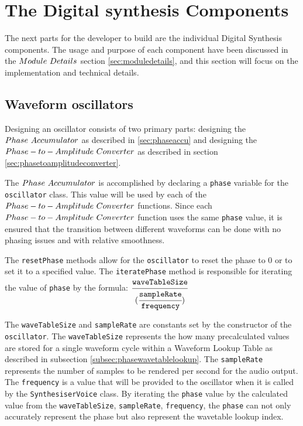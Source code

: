 \documentclass[a4paper,12pt]{report}
\begin{document}
\section{The Digital synthesis Components}
\label{sec:digitalsynthesiscomponents}
The next parts for the developer to build are the individual Digital Synthesis components. The usage and purpose of each component have been discussed in the $Module\ \-Details$ section \ref{sec:moduledetails}, and this section will focus on the implementation and technical details.

\subsection{Waveform oscillators}
\label{subsec:waveformosc}
Designing an oscillator consists of two primary parts: designing the $Phase\ \-Accumulator$ as described in \ref{sec:phaseaccu} and designing the $Phase-to-Amplitude\ \-Converter$ as described in section \ref{sec:phasetoamplitudeconverter}.

The $Phase\ \-Accumulator$ is accomplished by declaring a \texttt{phase} variable for the \texttt{oscillator} class. This value will be used by each of the $Phase-to-Amplitude\ \-Converter$ functions. Since each $Phase-to-Amplitude\ \-Converter$ function uses the same \texttt{phase} value, it is ensured that the transition between different waveforms can be done with no phasing issues and with relative smoothness.

The \texttt{resetPhase} methods allow for the \texttt{oscillator} to reset the phase to $0$ or to set it to a specified value. The \texttt{iteratePhase} method is responsible for iterating the value of \texttt{phase} by the formula: \begin{math}
\cfrac{\texttt{waveTableSize}}{(\cfrac{\texttt{sampleRate}}{\texttt{frequency}})}
\end{math}

The \texttt{wave\-Table\-Size} and \texttt{sample\-Rate} are constants set by the constructor of the \texttt{oscillator}. The \texttt{wave\-Table\-Size} represents the how many precalculated values are stored for a single waveform cycle within a Waveform Lookup Table as described in subsection \ref{subsec:phasewavetablelookup}. The \texttt{sample\-Rate} represents the number of samples to be rendered per second for the audio output. The \texttt{frequency} is a value that will be provided to the oscillator when it is called by the \texttt{Synthesiser\-Voice} class. By iterating the \texttt{phase} value by the calculated value from the \texttt{wave\-Table\-Size}, \texttt{sample\-Rate}, \texttt{frequency}, the \texttt{phase} can not only accurately represent the phase but also represent the wavetable lookup index.
\end{document}
